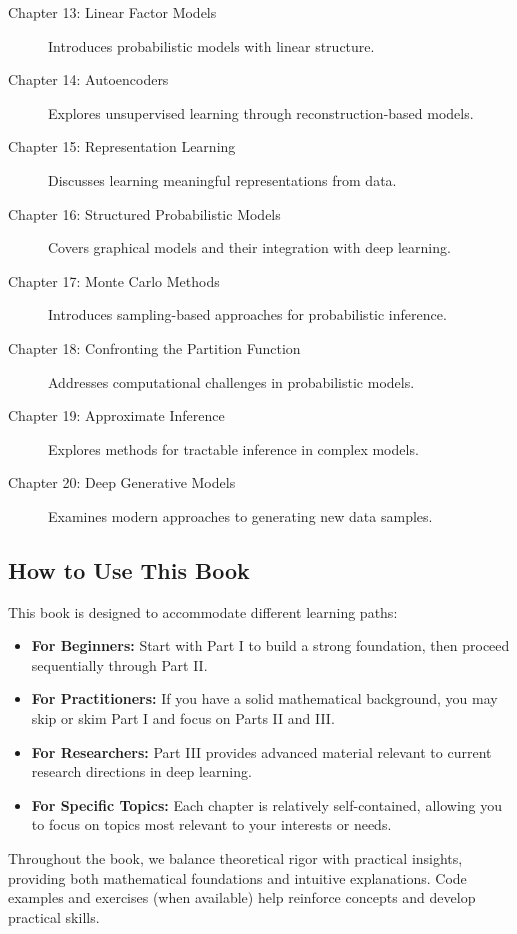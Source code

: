 \begin{description}
    \item[Chapter 13: Linear Factor Models] Introduces probabilistic models with linear structure.
    
    \item[Chapter 14: Autoencoders] Explores unsupervised learning through reconstruction-based models.
    
    \item[Chapter 15: Representation Learning] Discusses learning meaningful representations from data.
    
    \item[Chapter 16: Structured Probabilistic Models] Covers graphical models and their integration with deep learning.
    
    \item[Chapter 17: Monte Carlo Methods] Introduces sampling-based approaches for probabilistic inference.
    
    \item[Chapter 18: Confronting the Partition Function] Addresses computational challenges in probabilistic models.
    
    \item[Chapter 19: Approximate Inference] Explores methods for tractable inference in complex models.
    
    \item[Chapter 20: Deep Generative Models] Examines modern approaches to generating new data samples.
\end{description}

\subsection{How to Use This Book}

This book is designed to accommodate different learning paths:

\begin{itemize}
    \item \textbf{For Beginners:} Start with Part I to build a strong foundation, then proceed sequentially through Part II.
    
    \item \textbf{For Practitioners:} If you have a solid mathematical background, you may skip or skim Part I and focus on Parts II and III.
    
    \item \textbf{For Researchers:} Part III provides advanced material relevant to current research directions in deep learning.
    
    \item \textbf{For Specific Topics:} Each chapter is relatively self-contained, allowing you to focus on topics most relevant to your interests or needs.
\end{itemize}

Throughout the book, we balance theoretical rigor with practical insights, providing both mathematical foundations and intuitive explanations. Code examples and exercises (when available) help reinforce concepts and develop practical skills.
